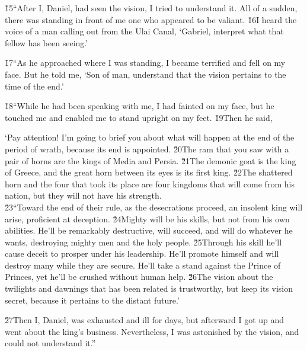 \v{15}``After I, Daniel, had seen the vision, I tried to understand it. All of a sudden, there was standing in front of me one who appeared to be valiant. \v{16}I heard the voice of a man calling out from the Ulai Canal, `Gabriel, interpret what that fellow has been seeing.'

\v{17}``As he approached where I was standing, I became terrified and fell on my face. But he told me, `Son of man, understand that the vision pertains to the time of the end.'

\v{18}``While he had been speaking with me, I had fainted on my face, but he touched me and enabled me to stand upright on my feet. \v{19}Then he said,

\begin{poetry}
\poeml `Pay attention! I'm going to brief you about what will happen at the end of the period of wrath, because its end is appointed. \v{20}The ram that you saw with a pair of horns are the kings of Media and Persia. \v{21}The demonic goat is the king of Greece, and the great horn between its eyes is its first king. \v{22}The shattered horn and the four that took its place are four kingdoms that will come from his nation, but they will not have his strength. \\
\poeml \v{23}``Toward the end of their rule, as the desecrations proceed, an insolent king will arise, proficient at deception. \v{24}Mighty will be his skills, but not from his own abilities. He'll be remarkably destructive, will succeed, and will do whatever he wants, destroying mighty men and the holy people. \v{25}Through his skill he'll cause deceit to prosper under his leadership. He'll promote himself and will destroy many while they are secure. He'll take a stand against the Prince of Princes, yet he'll be crushed without human help. \v{26}The vision about the twilights and dawnings that has been related is trustworthy, but keep its vision secret, because it pertains to the distant future.'
\end{poetry}

\v{27}Then I, Daniel, was exhausted and ill for days, but afterward I got up and went about the king's business. Nevertheless, I was astonished by the vision, and could not understand it.''

